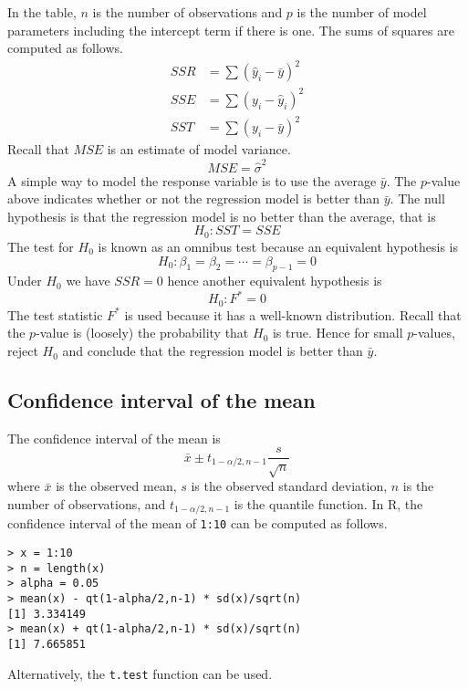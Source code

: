 \documentclass[12pt]{article}
\begin{document}
In the table, $n$ is the number of observations and $p$ is the
number of model parameters including the intercept term
if there is one.
The sums of squares are computed as follows.
\begin{align*}
SSR&=\sum(\hat y_i-\bar y)^2\\
SSE&=\sum(y_i-\hat y_i)^2\\
SST&=\sum(y_i-\bar y)^2
\end{align*}
Recall that $MSE$ is an estimate of model variance.
\[
MSE=\hat\sigma^2
\]
A simple way to model the response variable is to use the average $\bar y$.
The $p$-value above indicates whether or not the regression model
is better than $\bar y$.
The null hypothesis is that the regression model is no better
than the average, that is
\[
H_0:SST=SSE
\]
The test for $H_0$ is known as an omnibus test because an
equivalent hypothesis is
\[
H_0:\beta_1=\beta_2=\cdots=\beta_{p-1}=0
\]
Under $H_0$ we have $SSR=0$ hence another
equivalent hypothesis is
\[
H_0:F^*=0
\]
The test statistic $F^*$ is used
because it has a well-known distribution.
Recall that the $p$-value is (loosely) the probability
that $H_0$ is true.
Hence for small $p$-values, reject $H_0$ and
conclude that the regression model is better than $\bar y$.

\subsection*{Confidence interval of the mean}
The confidence interval of the mean is
\[
\bar x\pm t_{1-\alpha/2, n-1}\frac{s}{\sqrt n}
\]
where $\bar x$ is the observed mean,
$s$ is the observed standard deviation,
$n$ is the number of observations,
and $t_{1-\alpha/2, n-1}$ is the quantile function.
In R, the confidence interval of the mean of \verb$1:10$
can be computed as follows.

\begin{Verbatim}
> x = 1:10
> n = length(x)
> alpha = 0.05
> mean(x) - qt(1-alpha/2,n-1) * sd(x)/sqrt(n)
[1] 3.334149
> mean(x) + qt(1-alpha/2,n-1) * sd(x)/sqrt(n)
[1] 7.665851
\end{Verbatim}

Alternatively, the \verb$t.test$ function can be used.
\end{document}
